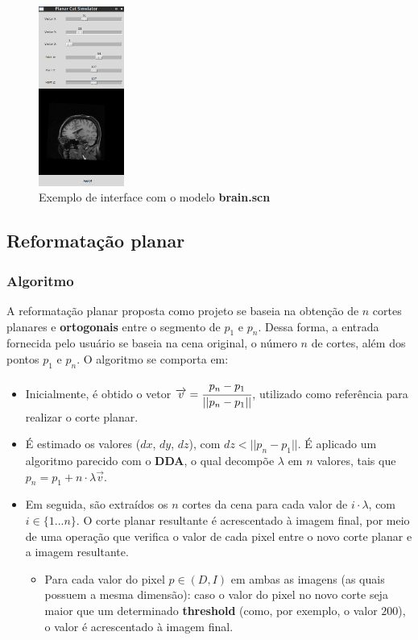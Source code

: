             \begin{figure}[ht!]
                \centering
                \includegraphics[width=1.1in]{figures/planar_interface}
                \caption{Exemplo de interface com o modelo \textbf{brain.scn}}
            \end{figure}

    \subsection{Reformatação planar}
        \subsubsection{Algoritmo}
            A reformatação planar proposta como projeto se baseia na obtenção de $n$ cortes planares e \textbf{ortogonais} entre o segmento de $p_1$ e $p_n$. Dessa forma, a entrada fornecida pelo usuário se baseia na cena original, o número $n$ de cortes, além dos pontos $p_1$ e $p_n$. O algoritmo se comporta em:

            \begin{itemize}
                \item Inicialmente, é obtido o vetor $\overrightarrow{v} = \cfrac{p_n - p_1}{||p_n - p_1||}$, utilizado como referência para realizar o corte planar.
                \item É estimado os valores ($dx$, $dy$, $dz$), com $dz < ||p_n - p_1||$. É aplicado um algoritmo parecido com o \textbf{DDA}, o qual decompõe $\lambda$ em $n$ valores, tais que $p_n = p_1 + n\cdot\lambda\overrightarrow{v}$.
                \item Em seguida, são extraídos os $n$ cortes da cena para cada valor de $i\cdot\lambda$, com $i \in \{1...n\}$. O corte planar resultante é acrescentado à imagem final, por meio de uma operação que verifica o valor de cada pixel entre o novo corte planar e a imagem resultante. 
                \begin{itemize}
                    \item Para cada valor do pixel $p \in (D, I)$ em ambas as imagens (as quais possuem a mesma dimensão): caso o valor do pixel no novo corte seja maior que um determinado \textbf{threshold} (como, por exemplo, o valor $200$), o valor é acrescentado à imagem final.
                \end{itemize}
            \end{itemize}

